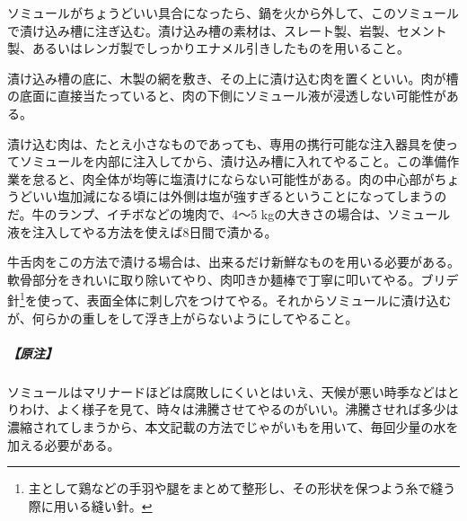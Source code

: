 \begin{recette}
ソミュールがちょうどいい具合になったら、鍋を火から外して、このソミュールで漬け込み槽に注ぎ込む。漬け込み槽の素材は、スレート製、岩製、セメント製、あるいはレンガ製でしっかりエナメル引きしたものを用いること。

漬け込み槽の底に、木製の網を敷き、その上に漬け込む肉を置くといい。肉が槽の底面に直接当たっていると、肉の下側にソミュール液が浸透しない可能性がある。

漬け込む肉は、たとえ小さなものであっても、専用の携行可能な注入器具を使ってソミュールを内部に注入してから、漬け込み槽に入れてやること。この準備作業を怠ると、肉全体が均等に塩漬けにならない可能性がある。肉の中心部がちょうどいい塩加減になる頃には外側は塩が強すぎるということになってしまうのだ。牛のランプ、イチボなどの塊肉で、4〜5
kgの大きさの場合は、ソミュール液を注入してやる方法を使えば8日間で漬かる。

牛舌肉をこの方法で漬ける場合は、出来るだけ新鮮なものを用いる必要がある。軟骨部分をきれいに取り除いてやり、肉叩きか麺棒で丁寧に叩いてやる。ブリデ針\footnote{主として鶏などの手羽や腿をまとめて整形し、その形状を保つよう糸で縫う際に用いる縫い針。}を使って、表面全体に刺し穴をつけてやる。それからソミュールに漬け込むが、何らかの重しをして浮き上がらないようにしてやること。

\hypertarget{observation-grande-saumure}{%
\subparagraph{【原注】}\label{observation-grande-saumure}}

ソミュールはマリナードほどは腐敗しにくいとはいえ、天候が悪い時季などはとりわけ、よく様子を見て、時々は沸騰させてやるのがいい。沸騰させれば多少は濃縮されてしまうから、本文記載の方法でじゃがいもを用いて、毎回少量の水を加える必要がある。

\end{recette}
